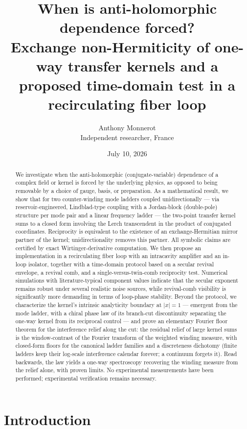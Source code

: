 \documentclass[11pt,a4paper]{article}
\title{\bfseries When is anti-holomorphic dependence forced?\\
Exchange non-Hermiticity of one-way transfer kernels and a proposed
time-domain test in a recirculating fiber loop}
\author{Anthony Monnerot\\ \small Independent researcher, France}
\date{July 10, 2026}
\begin{document}
\maketitle

\begin{abstract}
\noindent
We investigate when the anti-holomorphic (conjugate-variable) dependence of a
complex field or kernel is forced by the underlying physics, as opposed to being
removable by a choice of gauge, basis, or preparation. As a mathematical result, we
show that for two counter-winding mode ladders coupled unidirectionally --- via
reservoir-engineered, Lindblad-type coupling with a Jordan-block (double-pole)
structure per mode pair and a linear frequency ladder --- the two-point transfer
kernel sums to a closed form involving the Lerch transcendent in the product of
conjugated coordinates. Reciprocity is equivalent to the existence of an
exchange-Hermitian mirror partner of the kernel; unidirectionality removes this
partner. All symbolic claims are certified by exact Wirtinger-derivative
computation. We then propose an implementation in a recirculating fiber loop with
an intracavity amplifier and an in-loop isolator, together with a time-domain
protocol based on a secular revival envelope, a revival comb, and a
single-versus-twin-comb reciprocity test. Numerical simulations with
literature-typical component values indicate that the secular exponent remains
robust under several realistic noise sources, while revival-comb visibility is
significantly more demanding in terms of loop-phase stability. Beyond the protocol, we characterize the kernel's intrinsic analyticity boundary at $|x| = 1$ --- emergent from the mode ladder, with a chiral phase law of its branch-cut discontinuity separating the one-way kernel from its reciprocal control --- and prove an elementary Fourier floor theorem for the interference relief along the cut: the residual relief of large kernel sums is the window-contrast of the Fourier transform of the weighted winding measure, with closed-form floors for the canonical ladder families and a discreteness dichotomy (finite ladders keep their log-scale interference calendar forever; a continuum forgets it). Read backwards, the law yields a one-way spectroscopy recovering the winding measure from the relief alone, with proven limits. No experimental
measurements have been performed; experimental verification remains necessary.
\end{abstract}

\section{Introduction}
\end{document}
